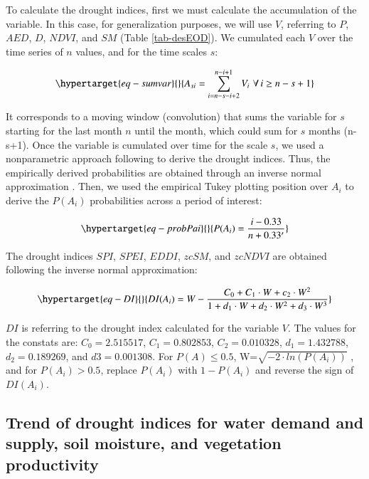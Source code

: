 \documentclass[
  number,
  preprint,
  3p,
  onecolumn]{elsarticle}
\begin{document}
To calculate the drought indices, first we must calculate the
accumulation of the variable. In this case, for generalization purposes,
we will use \(V\), referring to \(P\), \(AED\), \(D\), \(NDVI\), and
\(SM\) (Table \ref{tab-desEOD}). We cumulated each \(V\) over the time
series of \(n\) values, and for the time scales \(s\):

\begin{equation}\protect\hypertarget{eq-sumvar}{}{A_{si} = \sum_{i=n-s-i+2}^{n-i+1} V_i\,\, \forall\, i\geq n-s+1  }\label{eq-sumvar}\end{equation}

It corresponds to a moving window (convolution) that sums the variable
for \(s\) starting for the last month \(n\) until the month, which could
sum for \(s\) months (n-s+1). Once the variable is cumulated over time
for the scale \(s\), we used a nonparametric approach following
\citep{Hobbins2016} to derive the drought indices. Thus, the empirically
derived probabilities are obtained through an inverse normal
approximation \citep{Abramowitz1968}. Then, we used the empirical Tukey
plotting position \citep{Wilks2011} over \(A_i\) to derive the
\(P(A_i)\) probabilities across a period of interest:

\begin{equation}\protect\hypertarget{eq-probPai}{}{P(A_i) = \frac{i-0.33}{n+0.33'}}\label{eq-probPai}\end{equation}

The drought indices \(SPI\), \(SPEI\), \(EDDI\), \(zcSM\), and
\(zcNDVI\) are obtained following the inverse normal approximation:

\begin{equation}\protect\hypertarget{eq-DI}{}{DI(A_i) = W - \frac{C_0+C_1\cdot W + c_2 \cdot W^2}{1+d_1\cdot W +d_2\cdot W^2 +d_3\cdot W^3}}\label{eq-DI}\end{equation}

\(DI\) is referring to the drought index calculated for the variable
\(V\). The values for the constats are: \(C_0 = 2.515517\),
\(C_1 = 0.802853\), \(C_2 = 0.010328\), \(d_1 = 1.432788\),
\(d_2 = 0.189269\), and \(d3 = 0.001308\). For \(P(A) \leq 0.5\),
W=\(\sqrt{-2\cdot ln(P(A_i))}\) , and for \(P(A_i) > 0.5\), replace
\(P(A_i)\) with \(1-P(A_i)\) and reverse the sign of \(DI(A_i)\).

\hypertarget{trend-of-drought-indices-for-water-demand-and-supply-soil-moisture-and-vegetation-productivity}{%
\subsection{Trend of drought indices for water demand and supply, soil
moisture, and vegetation
productivity}\label{trend-of-drought-indices-for-water-demand-and-supply-soil-moisture-and-vegetation-productivity}}
\end{document}
